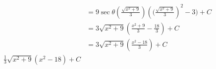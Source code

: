 \documentclass[preview]{standalone}
\begin{document}
\begin{align*}
&=9\sec\theta(\frac{\sqrt{x^2+9}}{3})({(\frac{\sqrt{x^2+9}}{3}})^2-3)+C \\ &=3\sqrt{x^2+9}(\frac{x^2+9}{3}-\frac{18}{3})+C \\ &=3\sqrt{x^2+9}(\frac{x^2-18}{3})+C \\ \frac{1}{3}\sqrt{x^2+9}(x^2-18)+C
\end{align*}
\end{document}
